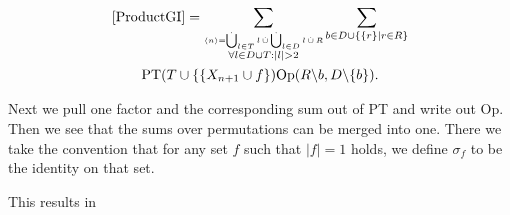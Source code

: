 \documentclass[b5paper,draft,openbib,12pt]{memoir}
\DeclareMathOperator{\dotCup}{\mathop{\dot{\bigcup}}}
\DeclareMathOperator{\dotcup}{\mathop{\dot{\cup}}}
\begin{document}
\begin{multline}\label{eq:ProductGI2}
\eqref{ProductGI}= \sum_{\stackrel{\langle n \rangle = \dotCup_{l\in T}l \dotcup \dotCup_{l\in D} l \dotcup R}{\forall l \in D \cup T: |l|>2} } \sum_{b \in D \cup \{ \{r\} \mid r\in R \}}  \\
\text{PT}(T\cup \{\{X_{n+1} \cup f\}) \text{Op}(R \backslash b, D\backslash \{b\}).
\end{multline}

Next we pull one factor and the corresponding sum out of PT and write out Op. Then we see that the sums over permutations 
can be merged into one. There we take the convention that for any set \(f\) such that \(|f|=1\) holds, we define \(\sigma_f\) to be
the identity on that set.

This results in
\end{document}
